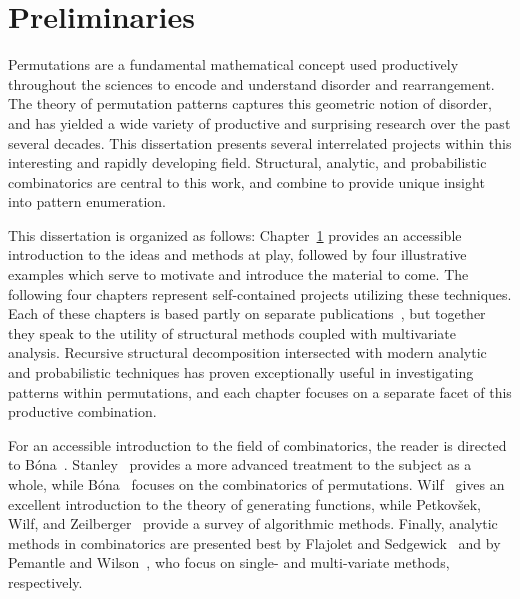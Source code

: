
\chapter{Preliminaries}
\label{chap:prelim}



  Permutations are a fundamental mathematical concept used productively
  throughout the sciences to encode and understand disorder and rearrangement. 
  The theory of permutation patterns captures this geometric notion of
  disorder, and has yielded a wide variety of productive and surprising
  research over the past several decades. This dissertation presents several
  interrelated projects within this interesting and rapidly developing field.
  Structural, analytic, and probabilistic combinatorics are central to this
  work, and combine to provide unique insight into pattern enumeration. 

  This dissertation is organized as follows: Chapter~\ref{chap:prelim} provides
  an accessible introduction to the ideas and methods at play, followed by four 
  illustrative examples which serve to motivate and introduce the material
  to come. The following four chapters represent self-contained projects
  utilizing these techniques.  Each of these chapters is based partly on
  separate publications~\cite{me-expat,me-polyclass,me-fixpat,me-involutions},
  but together they speak to the utility of structural methods coupled with
  multivariate analysis.  Recursive structural decomposition intersected with
  modern analytic and probabilistic techniques has proven exceptionally useful
  in investigating patterns within permutations, and each chapter focuses on a
  separate facet of this productive combination. 
  
  For an accessible introduction to the field of combinatorics, the reader is
  directed to B\'ona~\cite{BonaWalk}. Stanley~\cite{Stanley1, Stanley2}
  provides a more advanced treatment to the subject as a whole, while
  B\'ona~\cite{BonaPerm} focuses on the combinatorics of permutations. 
  Wilf~\cite{wilfbook} gives an excellent introduction to the theory of
  generating functions, while Petkov\v{s}ek, Wilf, and Zeilberger~\cite{A=B}
  provide a survey of algorithmic methods. 
  Finally, analytic methods in combinatorics are presented best by Flajolet and
  Sedgewick~\cite{flajolet} and by Pemantle and Wilson~\cite{pemantle}, who
  focus on single- and multi-variate methods, respectively.


